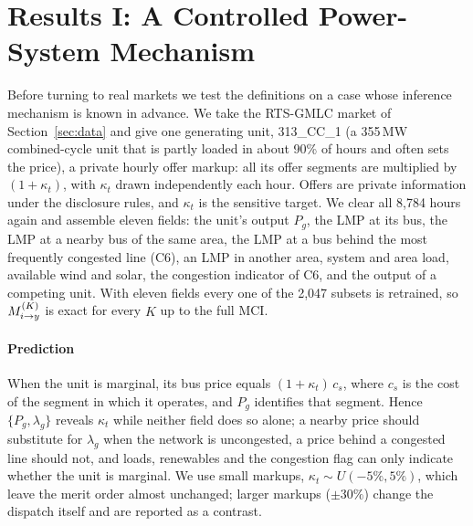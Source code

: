 \section{Results I: A Controlled Power-System Mechanism}\label{sec:res-mech}

Before turning to real markets we test the definitions on a case whose inference mechanism is known
in advance. We take the RTS-GMLC market of Section~\ref{sec:data} and give one generating unit,
313\_CC\_1 (a 355\,MW combined-cycle unit that is partly loaded in about 90\% of hours and often sets
the price), a private hourly offer markup: all its offer segments are multiplied by $(1+\kappa_t)$,
with $\kappa_t$ drawn independently each hour. Offers are private information under the disclosure
rules, and $\kappa_t$ is the sensitive target. We clear all 8,784 hours again and assemble eleven
fields: the unit's output $P_g$, the LMP at its bus, the LMP at a nearby bus of the same area, the
LMP at a bus behind the most frequently congested line (C6), an LMP in another area, system and area
load, available wind and solar, the congestion indicator of C6, and the output of a competing unit.
With eleven fields every one of the 2,047 subsets is retrained, so $M^{(K)}_{i \to y}$ is exact for every $K$ up to
the full MCI.

\paragraph{Prediction}
When the unit is marginal, its bus price equals $(1+\kappa_t)\,c_s$, where $c_s$ is the cost of the
segment in which it operates, and $P_g$ identifies that segment. Hence $\{P_g,\lambda_g\}$ reveals
$\kappa_t$ while neither field does so alone; a nearby price should substitute for $\lambda_g$ when the
network is uncongested, a price behind a congested line should not, and loads, renewables and the
congestion flag can only indicate whether the unit is marginal. We use small markups,
$\kappa_t\sim U(-5\%,5\%)$, which leave the merit order almost unchanged; larger markups
($\pm30\%$) change the dispatch itself and are reported as a contrast.

